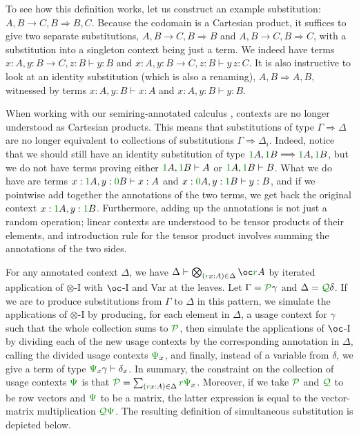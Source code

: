 To see how this definition works, let us construct an example substitution:
$A, B \to C, B \Longrightarrow B, C$.
Because the codomain is a Cartesian product, it suffices to give two separate
substitutions, $A, B \to C, B \Longrightarrow B$ and
$A, B \to C, B \Longrightarrow C$, with a substitution into a singleton
context being just a term.
We indeed have terms $x : A, y : B \to C, z : B \vdash y : B$ and
$x : A, y : B \to C, z : B \vdash y\,z : C$.
It is also instructive to look at an identity substitution (which is also a
renaming), $A, B \Longrightarrow A, B$, witnessed by terms
$x : A, y : B \vdash x : A$ and $x : A, y : B \vdash y : B$.

When working with our semiring-annotated calculus \name{}, contexts are no
longer understood as Cartesian products.
This means that substitutions of type $\Gamma \Longrightarrow \Delta$ are no
longer equivalent to collections of substitutions
$\Gamma \Longrightarrow \Delta_i$.
Indeed, notice that we should still have an identity substitution of type
$\gr1A, \gr1B \Longrightarrow \gr1A, \gr1B$, but we do not have terms proving
either $\gr1A, \gr1B \vdash A$ or $\gr1A, \gr1B \vdash B$.
What we do have are terms $x : \gr1A, y : \gr0B \vdash x : A$ and
$x : \gr0A, y : \gr1B \vdash y : B$, and if we pointwise add together the
annotations of the two terms, we get back the original context
$x : \gr1A, y : \gr1B$.
Furthermore, adding up the annotations is not just a random operation;
linear contexts are understood to be tensor products of their elements, and
introduction rule for the tensor product involves summing the annotations of
the two sides.

For any annotated context $\Delta$, we have
$\Delta \vdash \bigotimes_{(\gr rx : A) \in \Delta}\oc\gr rA$ by iterated
application of $\otimes$-I with $\oc$-I and Var at the leaves.
Let $\Gamma = \grP\gamma$ and $\Delta = \grQ\delta$.
If we are to produce substitutions from $\Gamma$ to $\Delta$ in this
pattern, we simulate the applications of $\otimes$-I by producing, for each
element in $\Delta$, a usage context for $\gamma$ such that the whole collection
sums to $\grP$, then simulate the applications of $\oc$-I by dividing each of
the new usage contexts by the corresponding annotation in $\Delta$, calling
the divided usage contexts $\gr\Psi_x$, and finally, instead of a variable
from $\delta$, we give a term of type $\gr\Psi_x\gamma \vdash \delta_x$.
In summary, the constraint on the collection of usage contexts $\gr\Psi$ is
that $\grP = \sum_{(\gr rx : A) \in \Delta}\gr r\gr\Psi_x$.
Moreover, if we take $\grP$ and $\grQ$ to be row vectors and $\gr\Psi$ to be a
matrix, the latter expression is equal to the vector-matrix multiplication
$\grQ\gr\Psi$.
The resulting definition of simultaneous substitution is depicted below.

